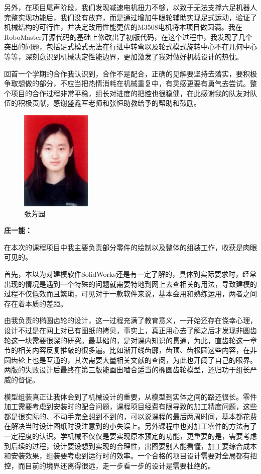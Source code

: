 \documentclass[12pt]{article}
\begin{document}
\begin{CJK}{UTF8}{gbsn}
另外，在项目尾声阶段，我们发现减速电机扭力不够，以致于无法支撑六足机器人完整实现功能后，我们没有放弃，而是通过增加牛眼轮辅助实现足式运动，验证了机械结构的可行性，并决定改用性能更优的M3508电机将本项目做圆满。我在RoboMaster开源代码的基础上修改出了初版代码，在这个过程中，我发现了几个突出的问题，包括足式模式无法在行进中转弯以及轮式模式旋转中心不在几何中心等等，深刻意识到机械决定性能边界，更加激发了我对做好机械设计的热忱。\par
回首一个学期的合作我认识到，合作不是配合，正确的见解要坚持去落实，要积极争取想做的部分，不应当把热情消耗在机械重复中，有灵感更要有勇气去尝试。整个项目的合作过程非常平稳，组长对进度的把控也很稳健，在此感谢我的队友对队伍的积极贡献，感谢盛鑫军老师和张恒助教给予的帮助和鼓励。
\begin{figure}[H]
\centering
\includegraphics[width=0.3\textwidth]{photo//fyy.jpg}
\caption{张芳园}
\end{figure}
\textbf{庄一能：}\par
在本次的课程项目中我主要负责部分零件的绘制以及整体的组装工作，收获是肉眼可见的。\par
首先，本以为对建模软件SolidWorks还是有一定了解的，具体到实际要求时，经常出现的情况是遇到一个特殊的问题就需要特地到网上去查相关的用法，导致建模的过程不仅低效而且繁琐，可见对于一款软件来说，基本会用和熟练运用，两者之间存在着本质的差距。\par
由我负责的椭圆齿轮的设计，这一过程充满了教育意义，一开始还存在侥幸心理，设计不过是在网上对已有图纸的拷贝，事实上，真正用心去了解之后才发现非圆齿轮这一块需要很深的研究。最基础的，是对课内知识的贯通，为此，直齿轮这一章节的相关内容反复推敲的很多遍。比如渐开线齿廓，齿顶、齿根圆这些内容，在非圆齿轮上也是互通的，其次需要大量相关文献的查阅，为此也开阔了自己的眼界。两版的失败设计后最终在第三版能画出啮合适当的椭圆齿轮模型，还归功于组长严威的督促。\par
模型组装真正让我体会到了机械设计的重要，从模型到实体之间的路还很长。零件加工需要考虑到安装时的配合问题，课程项目经费有限导致的加工精度问题，这些都是很实际的、不动手完全想到不到的，可以说课程的最后两周时间，基本都花费在解决当时设计图纸时没注意到的小失误上。另外课程中也对加工零件的方法有了一定程度的认识。学机械不仅仅是要实现原本预定的功能，更重要的是，需要考虑到后续的过程，设计要设想到实现的合理性，出图要别人能看懂，加工要综合成本和安装效果，组装要考虑到运行时的效率。一个合格的项目设计需要对全局都有把控，而目前的境界还离得很远，走一步看一步的设计是需要杜绝的。\par

\end{CJK}
\end{document}
